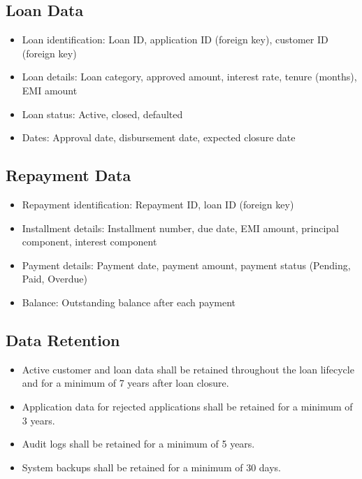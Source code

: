 \documentclass[12pt,a4paper,oneside]{report}
\begin{document}
\subsection{Loan Data}

\begin{itemize}
  \item Loan identification: Loan ID, application ID (foreign key), customer ID (foreign key)
  \item Loan details: Loan category, approved amount, interest rate, tenure (months), EMI amount
  \item Loan status: Active, closed, defaulted
  \item Dates: Approval date, disbursement date, expected closure date
\end{itemize}

\subsection{Repayment Data}

\begin{itemize}
  \item Repayment identification: Repayment ID, loan ID (foreign key)
  \item Installment details: Installment number, due date, EMI amount, principal component, interest component
  \item Payment details: Payment date, payment amount, payment status (Pending, Paid, Overdue)
  \item Balance: Outstanding balance after each payment
\end{itemize}

\subsection{Data Retention}

\begin{itemize}
  \item Active customer and loan data shall be retained throughout the loan lifecycle and for a minimum of 7 years after loan closure.
  \item Application data for rejected applications shall be retained for a minimum of 3 years.
  \item Audit logs shall be retained for a minimum of 5 years.
  \item System backups shall be retained for a minimum of 30 days.
\end{itemize}
\end{document}
